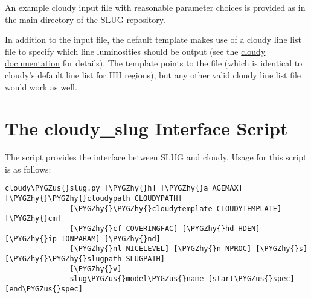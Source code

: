 \documentclass[letterpaper,10pt,english]{sphinxmanual}
\def\PYGZus{\char`\_}
\def\PYGZhy{\char`\-}
\begin{document}
An example cloudy input file with reasonable parameter choices is
provided as  in the main directory
of the SLUG repository.

In addition to the input file, the default template makes use of a
cloudy line list file to specify which line luminosities should be
output (see the \href{http://nublado.org}{cloudy documentation} for
details). The template points to the file
 (which is identical to cloudy's
default line list for HII regions), but any other valid cloudy line
list file would work as well.


\section{The cloudy\_slug Interface Script}
\label{cloudy:ssec-cloudy-slug-options}\label{cloudy:the-cloudy-slug-interface-script}
The  script provides the interface between SLUG and
cloudy. Usage for this script is as follows:

\begin{Verbatim}[commandchars=\\\{\}]
cloudy\PYGZus{}slug.py [\PYGZhy{}h] [\PYGZhy{}a AGEMAX] [\PYGZhy{}\PYGZhy{}cloudypath CLOUDYPATH]
               [\PYGZhy{}\PYGZhy{}cloudytemplate CLOUDYTEMPLATE] [\PYGZhy{}cm]
               [\PYGZhy{}cf COVERINGFAC] [\PYGZhy{}hd HDEN] [\PYGZhy{}ip IONPARAM] [\PYGZhy{}nd]
               [\PYGZhy{}nl NICELEVEL] [\PYGZhy{}n NPROC] [\PYGZhy{}s] [\PYGZhy{}\PYGZhy{}slugpath SLUGPATH]
               [\PYGZhy{}v]
               slug\PYGZus{}model\PYGZus{}name [start\PYGZus{}spec] [end\PYGZus{}spec]
\end{Verbatim}
\end{document}
